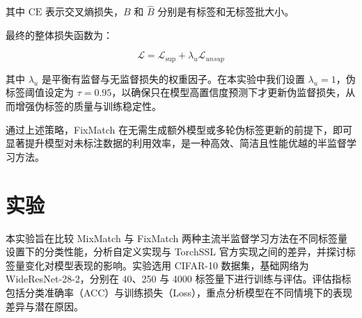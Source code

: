 \documentclass[a4paper, utf8]{ctexart}
\begin{document}
	其中 $\text{CE}$ 表示交叉熵损失，$B$ 和 $\hat{B}$ 分别是有标签和无标签批大小。
	
	最终的整体损失函数为：
	
	\vspace{-.5em}
	\begin{equation}
		\mathcal{L} = \mathcal{L}_{\text{sup}} + \lambda_u\mathcal{L}_{unsup}
	\end{equation}
	
	其中 $\lambda_u$ 是平衡有监督与无监督损失的权重因子。在本实验中我们设置 $\lambda_u=1$，伪标签阈值设定为 $\tau=0.95$，以确保只在模型高置信度预测下才更新伪监督损失，从而增强伪标签的质量与训练稳定性。
	
	通过上述策略，FixMatch 在无需生成额外模型或多轮伪标签更新的前提下，即可显著提升模型对未标注数据的利用效率，是一种高效、简洁且性能优越的半监督学习方法。
	
	\section{实验}
	
	本实验旨在比较 MixMatch 与 FixMatch 两种主流半监督学习方法在不同标签量设置下的分类性能，分析自定义实现与 TorchSSL 官方实现之间的差异，并探讨标签量变化对模型表现的影响。实验选用 CIFAR-10 数据集，基础网络为 WideResNet-28-2，分别在 40、250 与 4000 标签量下进行训练与评估。评估指标包括分类准确率（ACC）与训练损失（Loss），重点分析模型在不同情境下的表现差异与潜在原因。
	
\end{document}

